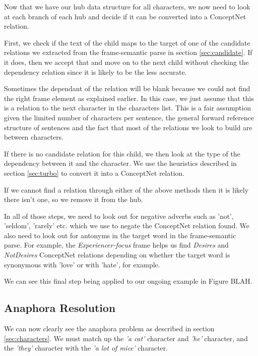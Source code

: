 Now that we have our hub data structure for all characters, we now need to look at each branch of each hub and decide if it can be converted into a ConceptNet relation.

First, we check if the text of the child maps to the target of one of the candidate relations we extracted from the frame-semantic parse in section \ref{sec:candidate}. If it does, then we accept that and move on to the next child without checking the dependency relation since it is likely to be the less accurate. 

Sometimes the dependant of the relation will be blank because we could not find the right frame element as explained earlier. In this case, we just assume that this is a relation to the next character in the characters list. This is a fair assumption given the limited number of characters per sentence, the general forward reference structure of sentences and the fact that most of the relations we look to build are between characters.

If there is no candidate relation for this child, we then look at the type of the dependency between it and the character. We use the heuristics described in section \ref{sec:turbo} to convert it into a ConceptNet relation.

If we cannot find a relation through either of the above methods then it is likely there isn't one, so we remove it from the hub.

In all of those steps, we need to look out for negative adverbs such as 'not', 'seldom', 'rarely' etc. which we use to negate the ConceptNet relation found. We also need to look out for antonyms in the target word in the frame-semantic parse. For example, the \textit{Experiencer-focus} frame helps us find \textit{Desires} and \textit{NotDesires} ConceptNet relations depending on whether the target word is synonymous with 'love' or with 'hate', for example.

We can see this final step being applied to our ongoing example in Figure BLAH.


\subsection{Anaphora Resolution}
\label{sec:ar}
We can now clearly see the anaphora problem as described in section \ref{sec:characters}. We must match up the \textit{'a cat'} character and \textit{'he'} character, and the \textit{'they'} character with the \textit{'a lot of mice'} character. 

